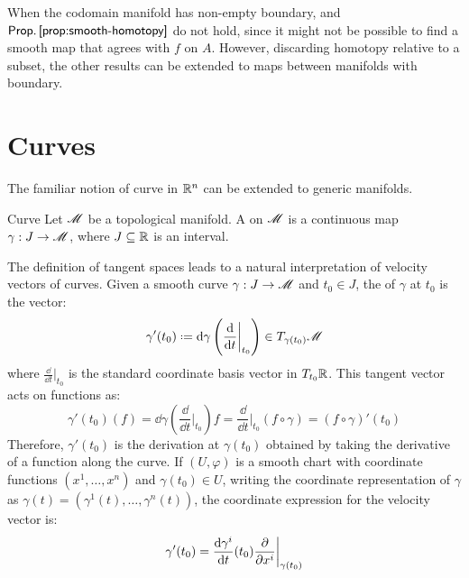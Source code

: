 When the codomain manifold has non-empty boundary,  and $ \pref{prop:smooth-homotopy} $ do not hold, since it might not be possible to find a smooth map that agrees with $ f $ on $ A $. However, discarding homotopy relative to a subset, the other results can be extended to maps between manifolds with boundary.

\section{Curves}

The familiar notion of curve in $ \mathbb{R}^n $ can be extended to generic manifolds.

\begin{definition}{Curve}{}
  Let $ \mathscr{M} $ be a topological manifold. A  on $ \mathscr{M} $ is a continuous map $ \gamma : J \rightarrow \mathscr{M} $, where $ J \subseteq \mathbb{R} $ is an interval.
\end{definition}

The definition of tangent spaces leads to a natural interpretation of velocity vectors of curves. Given a smooth curve $ \gamma : J \rightarrow \mathscr{M} $ and $ t_0 \in J $, the  of $ \gamma $ at $ t_0 $ is the vector:
\begin{equation}
  \gamma'(t_0) \defeq \dd \gamma \left( \frac{\dd}{\dd t} \bigg\vert_{t_0} \right) \in T_{\gamma(t_0)}\man
\end{equation}
where $ \frac{\dd}{\dd t} \vert_{t_0} $ is the standard coordinate basis vector in $ T_{t_0}\mathbb{R} $. This tangent vector acts on functions as:
\begin{equation*}
  \gamma'(t_0) (f) = \dd \gamma \left( \frac{\dd}{\dd t} \bigg\vert_{t_0} \right) f = \frac{\dd}{\dd t} \bigg\vert_{t_0} (f \circ \gamma) = (f \circ \gamma)'(t_0)
\end{equation*}
Therefore, $ \gamma'(t_0) $ is the derivation at $ \gamma(t_0) $ obtained by taking the derivative of a function along the curve\footnotemark. If $ (U,\varphi) $ is a smooth chart with coordinate functions $ (x^1 , \dots , x^n) $ and $ \gamma(t_0) \in U $, writing the coordinate representation of $ \gamma $ as $ \gamma(t) = (\gamma^1(t) , \dots , \gamma^n(t)) $, the coordinate expression for the velocity vector is:
\begin{equation}
  \gamma'(t_0) = \frac{\mathrm{d} \gamma^i}{\mathrm{d} t}(t_0) \frac{\partial}{\partial x^i} \bigg\vert_{\gamma(t_0)}
\end{equation}



